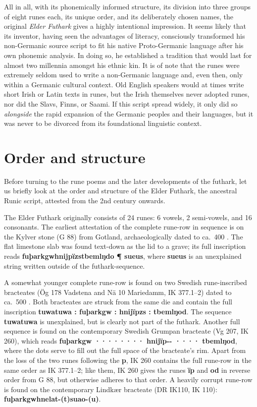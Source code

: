 All in all, with its phonemically informed structure, its division into three groups of eight runes each, its unique order, and its deliberately chosen names, the original \emph{Elder Futhark} gives a highly intentional impression.  It seems likely that its inventor, having seen the advantages of literacy, consciously transformed his non-Germanic source script to fit his native Proto-Germanic language after his own phonemic analysis.  In doing so, he established a tradition that would last for almost two millennia amongst his ethnic kin.  It is of note that the runes were extremely seldom used to write a non-Germanic language and, even then, only within a Germanic cultural context.  Old English speakers would at times write short Irish or Latin texts in runes, but the Irish themselves never adopted runes, nor did the Slavs, Finns, or Saami.  If this script spread widely, it only did so \emph{alongside} the rapid expansion of the Germanic peoples and their languages, but it was never to be divorced from its foundational linguistic context.

\section{Order and structure}

Before turning to the rune poems and the later developments of the futhark, let us briefly look at the order and structure of the Elder Futhark, the ancestral Runic script, attested from the 2nd century onwards.

The Elder Futhark originally consists of 24 runes: 6 vowels, 2 semi-vowels, and 16 consonants.  The earliest attestation of the complete rune-row in sequence is on the Kylver stone (G 88) from Gotland, archaeologically dated to ca.~400 \ce.%
The flat limestone slab was found text-down as the lid to a grave; its full inscription reads \textbf{fuþarkgwhnijpïzstbemlŋdo ¶ sueus}, where \textbf{sueus} is an unexplained string written outside of the futhark-sequence.

A somewhat younger complete rune-row is found on two Swedish rune-inscribed bracteates (Ög 178 Vadstena and Nä 10 Mariedamm, IK 377.1--2) dated to ca.~500 \ce.  Both bracteates are struck from the same die and contain the full inscription \textbf{tuwatuwa : fuþarkgw : hnijïpzs : tbemlŋod}.  The sequence \textbf{tuwatuwa} is unexplained, but is clearly not part of the futhark.  Another full sequence is found on the contemporary Swedish Grumpan bracteate (Vg 207, IK 260), which reads \textbf{fuþarkgw ········ hnijïp{-}{-} ···· tbemlŋod}, where the dots serve to fill out the full space of the bracteate’s rim.  Apart from the loss of the two runes following the \textbf{p}, IK 260 contains the full rune-row in the same order as IK 377.1--2; like them, IK 260 gives the runes \textbf{ïp} and \textbf{od} in reverse order from G 88, but otherwise adheres to that order.  A heavily corrupt rune-row is found on the contemporary Lindkær bracteate (DR IK110, IK 110): \textbf{fuþarkgwhnelat-(t)suao-(u)}.

